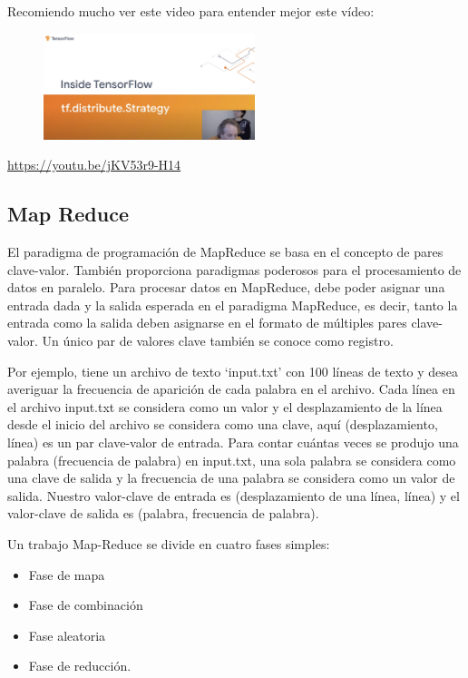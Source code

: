 \documentclass[10pt, fleqn, journal]{IEEEtran}
\theoremstyle{break}                                            %
\begin{document}
    Recomiendo mucho ver este video para entender mejor este vídeo:
    \begin{figure}[h!]
      \includegraphics[width=0.55\textwidth]{cover}
    \end{figure}

    \url{https://youtu.be/jKV53r9-H14}

    \subsection{Map Reduce}
      El paradigma de programación de MapReduce se basa en el concepto de pares clave-valor.
      También proporciona paradigmas poderosos para el procesamiento de datos en paralelo.
      Para procesar datos en MapReduce, debe poder asignar una entrada dada y la salida esperada en el paradigma
       MapReduce, es decir, tanto la entrada como la salida deben asignarse en el formato de múltiples pares 
       clave-valor. Un único par de valores clave también se conoce como registro.

      Por ejemplo, tiene un archivo de texto ‘input.txt’ con 100 líneas de texto y desea averiguar la frecuencia 
      de aparición de cada palabra en el archivo. Cada línea en el archivo input.txt se considera como un valor 
      y el desplazamiento de la línea desde el inicio del archivo se considera como una clave, aquí (desplazamiento, 
      línea) es un par clave-valor de entrada. Para contar cuántas veces se produjo una palabra (frecuencia de 
      palabra) en input.txt, una sola palabra se considera como una clave de salida y la frecuencia de una 
      palabra se considera como un valor de salida. Nuestro valor-clave de entrada es (desplazamiento de 
      una línea, línea) y el valor-clave de salida es (palabra, frecuencia de palabra).

      Un trabajo Map-Reduce se divide en cuatro fases simples: 
      \begin{itemize}
        \item Fase de mapa
        \item Fase de combinación
        \item Fase aleatoria
        \item Fase de reducción. 
      \end{itemize}
      
\end{document}
